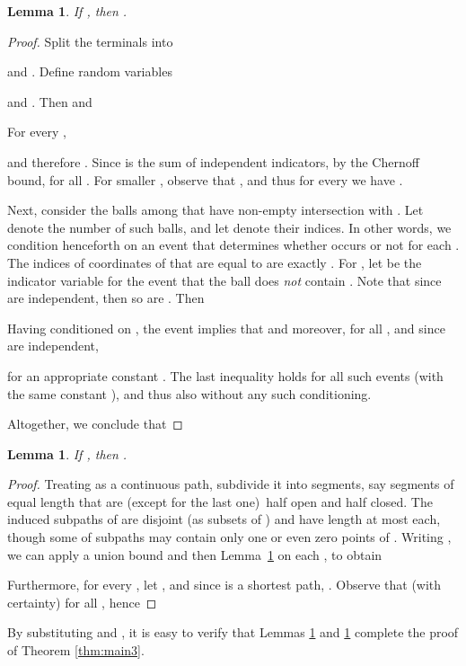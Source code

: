\documentclass[twoside,leqno,twocolumn]{article}
\newtheorem{lemma}[theorem]{Lemma}
\begin{document}
\begin{lemma} \label{l:shortShortest}
If , then .
\end{lemma}
\begin{proof}
Split the  terminals into 
 
and .
Define random variables 
 
and .
Then  and 

For every , 

and therefore .
Since  is the sum of independent indicators, 
by the Chernoff bound,  
for all .
For smaller , observe that , 
and thus for every  we have .

Next, consider the balls among  
that have non-empty intersection with . Let  denote the number of such balls, 
and let  denote their indices.
In other words, we condition henceforth on an event  
that determines whether  occurs or not for each . The indices of coordinates of  that are equal to  are exactly .
For , let  be the indicator variable for the event that the
ball  does \emph{not} contain . Note that since  are independent, then so are . Then

Having conditioned on ,
the event  implies that  and moreover,  for all ,
and since  are independent, 

for an appropriate constant . 
The last inequality holds for all such events  
(with the same constant ),
and thus also without any such conditioning.

Altogether, we conclude that

\end{proof}

\begin{lemma} \label{l:longShortest}
If , then .
\end{lemma}
\begin{proof}
Treating  as a continuous path, 
subdivide it into  segments,
say segments of equal length that are (except for the last one)\
half open and half closed.
The induced subpaths  of  
are disjoint (as subsets of ) and have length at most  each,
though some of subpaths may contain only one or even zero points of .
Writing , we can
apply a union bound and then Lemma~\ref{l:shortShortest} on each , 
to obtain

Furthermore, for every , 
let , 
and since  is a shortest path, 
.
Observe that  (with certainty) 
for all ,
hence

\end{proof}

By substituting  and , it is easy to verify that Lemmas \ref{l:shortShortest} and \ref{l:longShortest}
complete the proof of Theorem \ref{thm:main3}.
\end{document}
